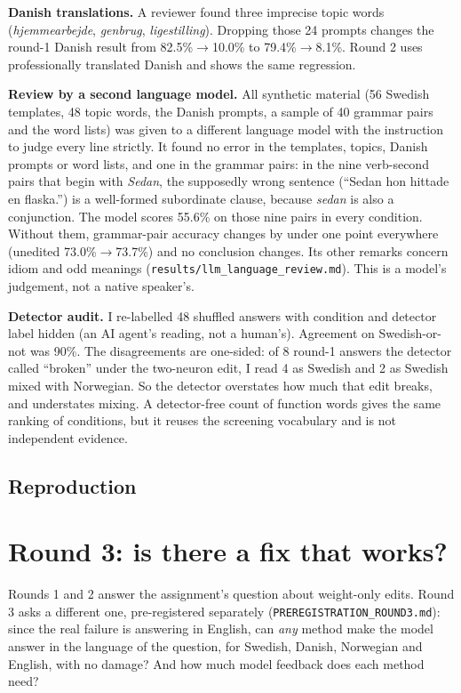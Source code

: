 \documentclass[10pt,a4paper]{article}
\newcommand{\code}[1]{{\small\texttt{#1}}}
\newcommand{\up}{$\rightarrow$}
\begin{document}
\textbf{Danish translations.} A reviewer found three imprecise topic words (\emph{hjemmearbejde}, \emph{genbrug}, \emph{ligestilling}). Dropping those 24 prompts changes the round-1 Danish result from 82.5\%\up10.0\% to 79.4\%\up8.1\%.
Round 2 uses professionally translated Danish and shows the same regression.

\textbf{Review by a second language model.} All synthetic material (56 Swedish templates, 48 topic words, the Danish prompts, a sample of 40 grammar pairs and the word lists) was given to a different language model with the instruction to judge every line strictly. It found no error in the templates, topics, Danish prompts or word lists, and one in the grammar pairs: in the nine verb-second pairs that begin with \emph{Sedan}, the supposedly wrong sentence (``Sedan hon hittade en flaska.'') is a well-formed subordinate clause, because \emph{sedan} is also a conjunction. The model scores 55.6\% on those nine pairs in every condition. Without them, grammar-pair accuracy changes by under one point everywhere (unedited 73.0\%\up73.7\%) and no conclusion changes. Its other remarks concern idiom and odd meanings (\code{results/llm\_language\_review.md}). This is a model's judgement, not a native speaker's.

\textbf{Detector audit.} I re-labelled 48 shuffled answers with condition and detector label hidden (an AI agent's reading, not a human's). Agreement on Swedish-or-not was 90\%.
The disagreements are one-sided: of 8 round-1 answers the detector called ``broken'' under the two-neuron edit, I read 4 as Swedish and 2 as Swedish mixed with Norwegian. So the detector overstates how much that edit breaks, and understates mixing.
A detector-free count of function words gives the same ranking of conditions, but it reuses the screening vocabulary and is not independent evidence.

\subsection{Reproduction}
\ReproText

\ReproTwoText

\section{Round 3: is there a fix that works?}\label{sec:r3}

Rounds 1 and 2 answer the assignment's question about weight-only edits. Round 3 asks a different one, pre-registered separately (\code{PREREGISTRATION\_ROUND3.md}): since the real failure is answering in English, can \emph{any} method make the model answer in the language of the question, for Swedish, Danish, Norwegian and English, with no damage? And how much model feedback does each method need?
\end{document}
